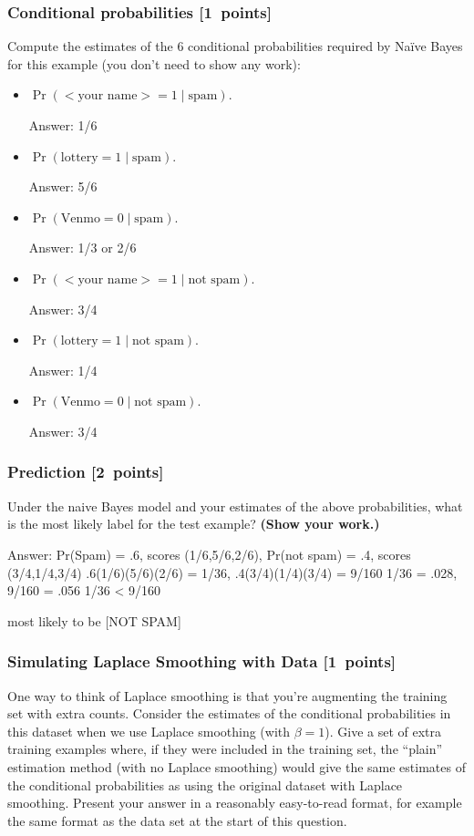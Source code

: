 \documentclass{article}
\newcommand{\blu}[1]{{\textcolor{blu}{#1}}}
\newcommand{\gre}[1]{\textcolor{gre}{#1}}
\newcommand\ans[1]{\par\gre{Answer: #1}}
\let\ask\blu
\newcommand\pts[1]{\textcolor{pointscolour}{[#1~points]}}
\begin{document}
    \subsubsection{Conditional probabilities \pts{1}}

    \ask{Compute the estimates of the 6 conditional probabilities required by Na\"ive Bayes for this example}  (you don't need to show any work):
    \begin{itemize}
        \item $\Pr(\text{$<$your name$>$} = 1  \mid \text{spam})$.
        \ans{1/6}
        \item $\Pr(\text{lottery} = 1 \mid \text{spam})$.
        \ans{5/6}
        \item $\Pr(\text{Venmo} = 0  \mid \text{spam})$.
        \ans{1/3 or 2/6}
        \item $\Pr(\text{$<$your name$>$} = 1  \mid \text{not spam})$.
        \ans{3/4}
        \item $\Pr(\text{lottery} = 1  \mid \text{not spam})$.
        \ans{1/4}
        \item $\Pr(\text{Venmo} = 0  \mid \text{not spam})$.
        \ans{3/4}
    \end{itemize}

    \subsubsection{Prediction \pts{2}}

    \ask{Under the naive Bayes model and your estimates of the above probabilities, what is the most likely label for the test example? \textbf{(Show your work.)}}
    \ans{
        Pr(Spam) = .6, scores (1/6,5/6,2/6), Pr(not spam) = .4, scores (3/4,1/4,3/4)
        .6(1/6)(5/6)(2/6) = 1/36,  .4(3/4)(1/4)(3/4) = 9/160
        1/36 = .028, 9/160 = .056
        1/36 < 9/160

        most likely to be [NOT SPAM]

    }
    \subsubsection{Simulating Laplace Smoothing with Data \pts{1}}
    \label{laplace.conceptual}

    One way to think of Laplace smoothing is that you're augmenting the training set with extra counts. Consider the estimates of the conditional probabilities in this dataset when we use Laplace smoothing (with $\beta = 1$).
    \ask{Give a set of extra training examples where, if they were included in the training set, the ``plain'' estimation method (with no Laplace smoothing) would give the same estimates of the conditional probabilities as using the original dataset with Laplace smoothing.}
    Present your answer in a reasonably easy-to-read format, for example the same format as the data set at the start of this question.
\end{document}
